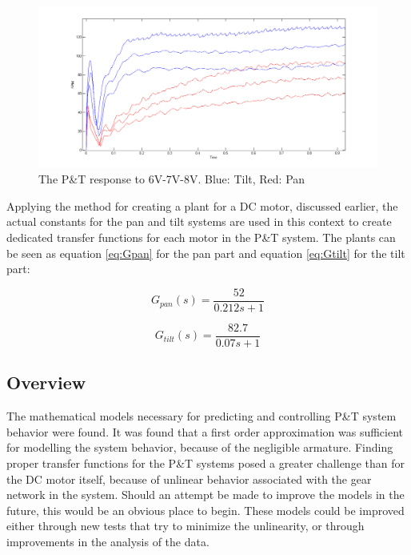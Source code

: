 \begin{figure}[h!]
\centering
\includegraphics[scale=0.35]{Billeder/PTStepResponseGraph.png}
\caption{The P\&T response to 6V-7V-8V. Blue: Tilt, Red: Pan}
\label{fig:PTStepResponseGraph}
\end{figure}

Applying the method for creating a plant for a DC motor, discussed earlier, the actual constants for the pan and tilt systems are used in this context to create dedicated transfer functions for each motor in the P\&T system. The plants can be seen as equation \ref{eq:Gpan} for the pan part and equation \ref{eq:Gtilt} for the tilt part:

\begin{equation}
G_{pan} (s) = \frac{52}{0.212s+1}
\label{eq:Gpan}
\end{equation}

\begin{equation}
G_{tilt} (s) = \frac{82.7}{0.07s+1}
\label{eq:Gtilt}
\end{equation}

\subsection{Overview}
The mathematical models necessary for predicting and controlling P\&T system behavior were found. It was found that a first order approximation was sufficient for modelling the system behavior, because of the negligible armature. Finding proper transfer functions for the P\&T systems posed a greater challenge than for the DC motor itself, because of unlinear behavior associated with the gear network in the system. Should an attempt be made to improve the models in the future, this would be an obvious place to begin. These models could be improved either through new tests that try to minimize the unlinearity, or through improvements in the analysis of the data.